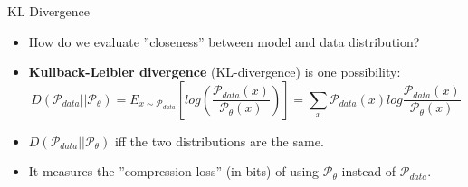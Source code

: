 \begin{frame}[allowframebreaks]{KL Divergence}
    \begin{itemize}
        \item How do we evaluate ”closeness” between model and data distribution?
        \item \textbf{Kullback-Leibler divergence} (KL-divergence) is one possibility:
        $$D(\mathcal{P}_{data}||\mathcal{P}_{\theta}) = E_{x \sim \mathcal{P}_{data}}   \left [log \left ( \frac{\mathcal{P}_{data}(x)}{\mathcal{P}_{\theta}(x)} \right ) \right ] = \sum_{x} \mathcal{P}_{data}(x) log \frac{\mathcal{P}_{data}(x)}{\mathcal{P}_{\theta}(x)}$$
        \item $D(\mathcal{P}_{data}||\mathcal{P}_{\theta})$ iff the two distributions are the same.
        \item It measures the ”compression loss” (in bits) of using $\mathcal{P}_{\theta}$ instead of $\mathcal{P}_{data}$.
    \end{itemize}
\end{frame}

